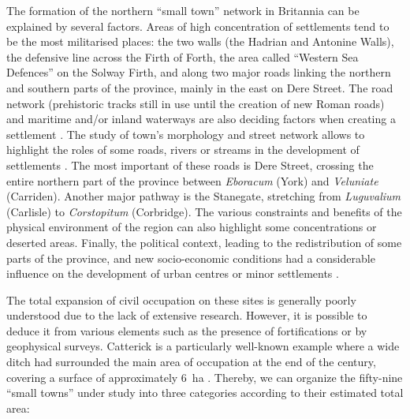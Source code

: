 The formation of the northern “small town” network in Britannia can be explained by several factors. Areas of high concentration of settlements tend to be the most militarised places: the two walls (the Hadrian and Antonine Walls), the defensive line across the Firth of Forth, the area called “Western Sea Defences” on the Solway Firth, and along two major roads linking the northern and southern parts of the province, mainly in the east on Dere Street. The road network (prehistoric tracks still in use until the creation of new Roman roads) and maritime and/or inland waterways are also deciding factors when creating a settlement \parencite[256]{Mattingly_2006}. The study of town’s morphology and street network allows to highlight the roles of some roads, rivers or streams in the development of settlements \parencite[203]{Petit_1994a}. The most important of these roads is Dere Street, crossing the entire northern part of the province between \emph{Eboracum} (York) and \emph{Veluniate} (Carriden). Another major pathway is the Stanegate, stretching from \emph{Luguvalium} (Carlisle) to \emph{Corstopitum} (Corbridge). The various constraints and benefits of the physical environment of the region can also highlight some concentrations or deserted areas. Finally, the political context, leading to the redistribution of some parts of the province, and new socio-economic conditions had a considerable influence on the development of urban centres or minor settlements \parencites[11]{Branigan_1980}[12]{Burnham_1990}.


The  total expansion of civil occupation on these sites is generally poorly understood due to the lack of extensive research. However, it is possible to deduce it from various elements such as the presence of fortifications or by geophysical surveys. Catterick is a particularly well-known example where a wide ditch had surrounded the main area of occupation at the end of the  century\AD, covering a surface of approximately \SI{6}{\hectare} \parencite[57]{Hartley_1988}. Thereby, we can organize the fifty-nine “small towns” under study into three categories according to their estimated total area:

